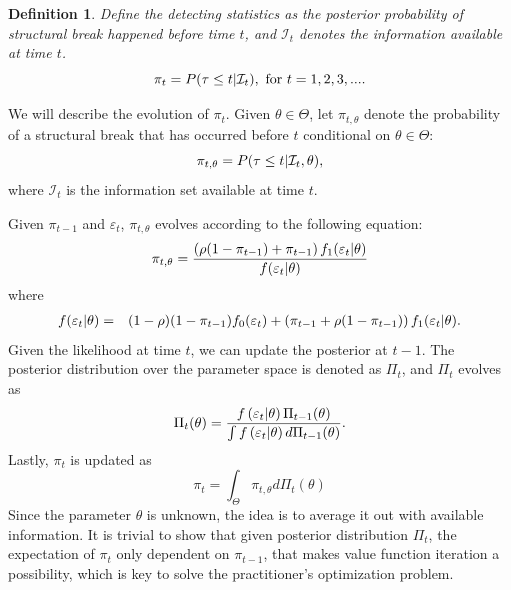 \documentclass[preprint,authoryear,12pt,english]{elsarticle}
\theoremstyle{plain}
\newtheorem{definition}{Definition}[section]
\begin{document}
\begin{definition}
    \label{post_pi}
    Define the detecting statistics as the posterior probability of structural break happened before time $t$, and $\mathcal{I}_{t}$ denotes the information available at time $t$.
    \begin{equation}
        \pi_{t} = P(\tau \leq t \text{\textbar} \mathcal{I}_{t}), \text{ for } t = 1,2,3,....
    \end{equation}
\end{definition}
We will describe the evolution of $\pi_{t}$. Given $\theta \in \Theta$, let $\pi_{t,\theta}$ denote the probability of a structural break that has occurred before $t$ conditional on $\theta \in \Theta$:
\begin{equation}\label{eq:pi_k}
    \pi_{t,\theta} = P(\tau \leq t \text{\textbar} \mathcal{I}_{t},\theta),
\end{equation}
where $\mathcal{I}_{t}$ is the information set available at time $t$.

Given $\pi_{t-1}$ and $\varepsilon_{t}$, $\pi_{t,\theta}$ evolves according to the following equation:
\begin{equation}
    \pi_{t,\theta} = \frac{\left(\rho(1-\pi_{t-1})+\pi_{t-1}\right)f_{1}(\varepsilon_{t}\text{\textbar}\theta)}{f(\varepsilon_{t}\text{\textbar}\theta)}\label{eq:piTheta}
\end{equation}
where
\begin{eqnarray*}
    f(\varepsilon_{t}\text{\textbar}\theta) &=& (1-\rho)(1-\pi_{t-1})f_{0}(\varepsilon_{t})+ \left(\pi_{t-1}+\rho(1-\pi_{t-1})\right)f_{1}(\varepsilon_{t}\text{\textbar}\theta).
\end{eqnarray*}
Given the likelihood at time $t$, we can update the posterior at $t-1$. The posterior distribution over the parameter space is denoted as $\Pi_{t}$, and $\Pi_{t}$ evolves as
\begin{equation}
    \Pi_{t}(\theta) = \frac{f\left( \varepsilon_{t} \text{\textbar}\theta \right)\Pi_{t-1}(\theta)}{\int f\left(\varepsilon_{t}\text{\textbar}\theta \right)d\Pi_{t-1}(\theta)}.
\end{equation}
Lastly, $\pi_{t}$ is updated as
\begin{equation}
    \pi_{t} = \int_{\Theta} \pi_{t,\theta}d\Pi_{t}(\theta)
\end{equation}
Since the parameter $\theta$ is unknown, the idea is to average it out with available information. It is trivial to show that given posterior distribution $\Pi_{t}$, the expectation of $\pi_{t}$ only dependent on $\pi_{t-1}$, that makes value function iteration a possibility, which is key to solve the practitioner's optimization problem.
\end{document}
